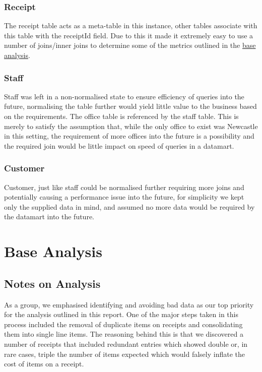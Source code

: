 \documentclass{article}
\begin{document}
            \subsubsection{Receipt}
                The receipt table acts as a meta-table in this instance, other tables associate with 
                this table with the receiptId field. Due to this it made it extremely easy to use a number
                of joins/inner joins to determine some of the metrics outlined in the \hyperref[sec:BA]{base analysis}.
            \subsubsection{Staff}
                Staff was left in a non-normalised state to ensure efficiency of queries into the future, 
                normalising the table further would yield little value to the business based on the requirements.
                The office table is referenced by the staff table. This is merely to satisfy the assumption
                that, while the only office to exist was Newcastle in this setting, the requirement of more 
                offices into the future is a possibility and the required join would be little impact on speed
                of queries in a datamart.
            \subsubsection{Customer}
                Customer, just like staff could be normalised further requiring more joins and potentially 
                causing a performance issue into the future, for simplicity we kept only the supplied
                data in mind, and assumed no more data would be required by the datamart into the future.

    \section{Base Analysis}
    \label{sec:BA}

        \subsection{Notes on Analysis}
            As a group, we emphasised identifying and avoiding bad data as our top priority for
            the analysis outlined in this report. One of the major steps taken in this process 
            included
            the removal of duplicate items on receipts and consolidating them into single line
            items. The reasoning behind this is that we discovered a number of receipts that
            included redundant entries which showed double or, in rare cases, triple the number
            of items expected which would falsely inflate the cost of items on a receipt.
\end{document}
